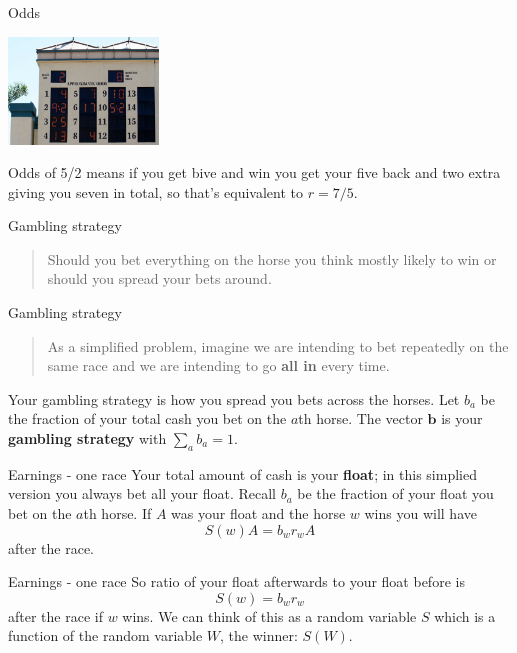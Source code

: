 \documentclass{beamer}
\newcommand{\crish}{\color{reddish}}
\newcommand{\cbla}{\color{black}}
\begin{document}
\begin{frame}{Odds}
  \begin{center}
    \includegraphics[width=4cm]{tote.jpg}
  \end{center}
Odds of \crish{}5/2\cbla{} means if you get bive and win you get your five back and two extra giving you seven in total, so that's equivalent to \crish$r=7/5$\cbla{}.
\end{frame}

\begin{frame}{Gambling strategy}
\begin{quote}
Should you bet everything on the horse you think mostly likely to win or should you spread your bets around.
  \end{quote}
\end{frame}

\begin{frame}{Gambling strategy}
\begin{quote}
  As a simplified problem, imagine we are intending to bet repeatedly on the same race and we are intending to go \textbf{all in} every time. 
\end{quote}
Your gambling strategy is how you spread you bets across the
horses. Let \crish$b_a$\cbla{} be the fraction of your total cash you bet
on the \crish$a$\cbla{}th horse. The vector \crish$\mathbf{b}$\cbla{}
is your \textbf{gambling strategy} with \crish$\sum_ab_a=1$\cbla{}.
\end{frame}
   

\begin{frame}{Earnings - one race}
Your total amount of cash is your \textbf{float}; in this simplied
version you always bet all your float.
\vskip 1cm
Recall \crish$b_a$\cbla{} be
the fraction of your float you bet on the \crish$a$\cbla{}th horse. If
\crish$A$\cbla{} was your float and the horse \crish$w$\cbla{} wins you will have
\crish$$S(w)A=b_wr_wA$$\cbla{} after the race.
\end{frame}


\begin{frame}{Earnings - one race}
So ratio of your float afterwards to your float before is
\crish$$S(w)=b_wr_w$$\cbla{} after the race if \crish$w$\cbla{} wins. We can think of this as a random variable \crish$S$\cbla{} which is a function of the random variable \crish$W$\cbla, the winner: \crish$S(W)$\cbla{}.
\end{frame}
\end{document}
